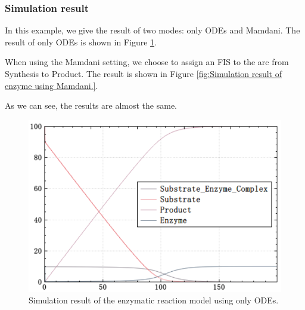 \documentclass[journal,a4paper,onecolumn]{article}
\begin{document}
\subsubsection{Simulation result}
In this example, we give the result of two modes: only ODEs and Mamdani. The result of only ODEs is shown in Figure \ref{fig:Simulation result of enzyme using only ODEs.}.

When using the Mamdani setting, we choose to assign an FIS to the arc from Synthesis to Product. The result is shown in Figure \ref{fig:Simulation result of enzyme using Mamdani.}.

As we can see, the results are almost the same.

\begin{figure}[!hbt]
	\begin{center}
		\includegraphics[width=\columnwidth]{fig26}
		\caption{Simulation result of the enzymatic reaction model using only ODEs.}
		\label{fig:Simulation result of enzyme using only ODEs.}
	\end{center}
\end{figure}
\end{document}
